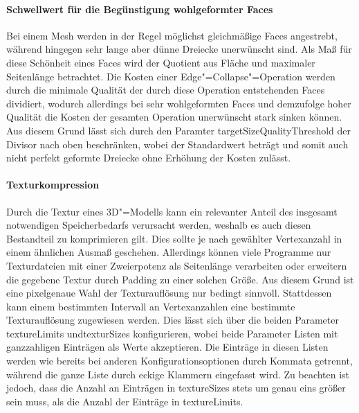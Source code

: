 \paragraph{Schwellwert für die Begünstigung wohlgeformter Faces} Bei einem Mesh werden in der Regel möglichst gleichmäßige Faces angestrebt, während hingegen sehr lange aber dünne Dreiecke unerwünscht sind. Als Maß für diese \glqq{}Schönheit\grqq{} eines Faces wird der Quotient aus Fläche und maximaler Seitenlänge betrachtet. Die Kosten einer Edge"=Collapse"=Operation werden durch die minimale Qualität der durch diese Operation entstehenden Faces dividiert, wodurch allerdings bei sehr wohlgeformten Faces und demzufolge hoher Qualität die Kosten der gesamten Operation unerwünscht stark sinken können. Aus diesem Grund lässt sich durch den Paramter {\ttfamily target\-Size\-Quality\-Threshold} der Divisor nach oben beschränken, wobei der Standardwert {} beträgt und somit auch nicht perfekt geformte Dreiecke ohne Erhöhung der Kosten zulässt.

\paragraph{Texturkompression} Durch die Textur eines 3D"=Modells kann ein relevanter Anteil des insgesamt notwendigen Speicherbedarfs verursacht werden, weshalb es auch diesen Bestandteil zu komprimieren gilt. Dies sollte je nach gewählter Vertexanzahl in einem ähnlichen Ausmaß geschehen. Allerdings können viele Programme nur Texturdateien mit einer Zweierpotenz als Seitenlänge verarbeiten oder erweitern die gegebene Textur durch Padding zu einer solchen Größe. Aus diesem Grund ist eine pixelgenaue Wahl der Texturauflösung nur bedingt sinnvoll. Stattdessen kann einem bestimmten Intervall an Vertexanzahlen eine bestimmte Texturauflösung zugewiesen werden. Dies lässt sich über die beiden Parameter {\ttfamily texture\-Limits} und{\ttfamily textur\-Sizes} konfigurieren, wobei beide Parameter Listen mit ganzzahligen Einträgen als Werte akzeptieren. Die Einträge in diesen Listen werden wie bereits bei anderen Konfigurationsoptionen durch Kommata getrennt, während die ganze Liste durch eckige Klammern eingefasst wird. Zu beachten ist jedoch, dass die Anzahl an Einträgen in {\ttfamily texture\-Sizes} stets um genau eins größer sein muss, als die Anzahl der Einträge in {\ttfamily texture\-Limits}. 

